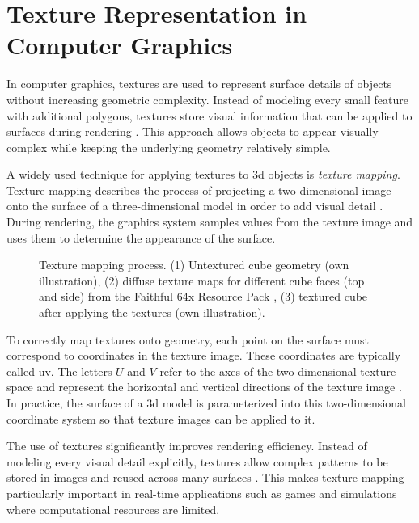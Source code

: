 \section{Texture Representation in Computer Graphics}

In computer graphics, textures are used to represent surface details of objects without increasing geometric complexity. Instead of modeling every small feature with additional polygons, textures store visual information that can be applied to surfaces during rendering \cite{watt1993computergraphics}. This approach allows objects to appear visually complex while keeping the underlying geometry relatively simple.

A widely used technique for applying textures to \gls{3d} objects is \textit{texture mapping}. Texture mapping describes the process of projecting a two-dimensional image onto the surface of a three-dimensional model in order to add visual detail \cite{watt1993computergraphics}. During rendering, the graphics system samples values from the texture image and uses them to determine the appearance of the surface.

\begin{figure}[H]
    \centering
    {Texture mapping process. (1) Untextured cube geometry (own illustration), (2) diffuse texture maps for different cube faces (top and side) from the Faithful 64x Resource Pack \cite{faithful64}, (3) textured cube after applying the textures (own illustration).}
    \label{fig:texture-mapping-cube}
\end{figure}

To correctly map textures onto geometry, each point on the surface must correspond to coordinates in the texture image. These coordinates are typically called \gls{uv}. The letters $U$ and $V$ refer to the axes of the two-dimensional texture space and represent the horizontal and vertical directions of the texture image \cite{wiki_texture_mapping}. In practice, the surface of a \gls{3d} model is parameterized into this two-dimensional coordinate system so that texture images can be applied to it.

The use of textures significantly improves rendering efficiency. Instead of modeling every visual detail explicitly, textures allow complex patterns to be stored in images and reused across many surfaces \cite{akenine2018realtime}. This makes texture mapping particularly important in real-time applications such as games and simulations where computational resources are limited.


